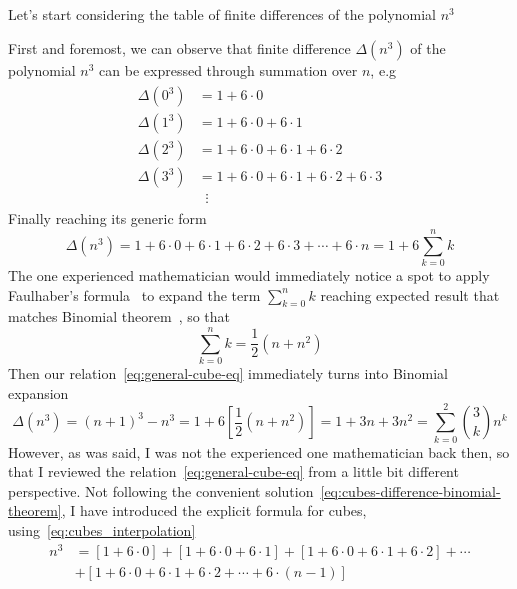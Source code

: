 Let's start considering the table of finite differences of the polynomial $n^3$

First and foremost, we can observe that finite difference $\Delta(n^3)$ of the polynomial $n^3$
can be expressed through summation over $n$, e.g
\begin{align}
    \label{eq:cubes_interpolation}
    \begin{split}
        \Delta(0^3) &= 1+6 \cdot 0 \\
        \Delta(1^3) &= 1+6\cdot0+6\cdot1 \\
        \Delta(2^3) &= 1+6\cdot0+6\cdot1+6\cdot2 \\
        \Delta(3^3) &= 1+6\cdot0+6\cdot1+6\cdot2+6\cdot3 \\
        &\; \; \vdots
    \end{split}
\end{align}
Finally reaching its generic form
\begin{equation}
    \Delta(n^3) = 1+6\cdot0+6\cdot1+6\cdot2+6\cdot3+\cdots+6\cdot n = 1 + 6 \sum_{k=0}^{n} k\label{eq:general-cube-eq}
\end{equation}
The one experienced mathematician would immediately notice a spot to apply Faulhaber's formula~\cite{beardon1996sums}
to expand the term $\sum_{k=0}^{n} k$ reaching expected result that matches Binomial theorem~\cite{abramowitz1988handbook},
so that
\begin{equation*}
    \sum_{k=0}^{n} k = \frac{1}{2}(n+n^2)
\end{equation*}
Then our relation~\eqref{eq:general-cube-eq} immediately turns into Binomial expansion
\begin{equation}
    \Delta(n^3) = (n+1)^3 - n^3 = 1 + 6 \left[ \frac{1}{2}(n+n^2) \right] = 1 + 3 n + 3 n^2 = \sum_{k=0}^{2} \binom{3}{k} n^k
    \label{eq:cubes-difference-binomial-theorem}
\end{equation}
However, as was said, I was not the experienced one mathematician back then,
so that I reviewed the relation~\eqref{eq:general-cube-eq} from a little bit different perspective.
Not following the convenient solution~\eqref{eq:cubes-difference-binomial-theorem},
I have introduced the explicit formula for cubes, using~\eqref{eq:cubes_interpolation}
\begin{align}
    \label{eq:rearrangement_to_get_cubes}
    n^3 &= [1+6\cdot0]+[1+6\cdot0+6\cdot1]+[1+6\cdot0+6\cdot1+6\cdot2]+\cdots \nonumber \\
    &+[1+6\cdot0+6\cdot1+6\cdot2+\cdots+6\cdot(n-1)]
\end{align}
